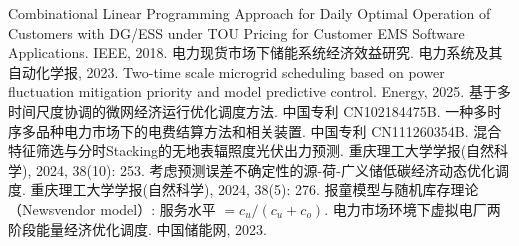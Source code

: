\documentclass[withoutpreface,bwprint]{cumcmthesis}
\begin{document}
\begin{abstract}
\textbf{针对问题四}\nobreak，本文在实时波动电价下重算问题二与三\nobreak，并明确 0:00 并不知道当日实际电价\nobreak：用周周期加权结构 $w_1p_{d-7,t}+w_2p_{d-14,t}+w_3p_{d-21,t}$ 叠加 LightGBM 残差修正预测电价\nobreak，平均绝对误差 \textbf{0.0451} 元/kWh\nobreak，预测只用于制定和调整计划\nobreak，费用一律按附件 4 实际电价结算\nobreak。第二问全年 \textbf{14\,386\,351} 元\nobreak，只比 0:00 已知实际电价的不可达上界高 \textbf{4.71 万元}\nobreak，差距 \textbf{0.33\%}\nobreak；第三问用当日已实现电价滚动修正并逐段调整\nobreak，全年 \textbf{14\,101\,772} 元\nobreak，比不做调整节约 \textbf{119.1 万元}\nobreak，降幅 \textbf{7.79\%}\nobreak。

\textbf{本文创新性在于}\nobreak：一是把预测与执行分开处理\nobreak，用报童分位统一刻画安全裕度\nobreak，证明裕度形式不重要\nobreak、分位水平才重要\nobreak；二是用预言机分解量化预测信息价值\nobreak，把距下界 136.9 万元缺口分解为光伏噪声 35.9\%\nobreak、负荷噪声 31.0\% 和交互 33.2\%\nobreak；三是揭示经验情景随机规划因情景内储能自由度重复利用而失效的机理\nobreak，费用上升 192.6\%\nobreak。

\end{abstract}














\begin{thebibliography}{9}
 Combinational Linear Programming Approach for Daily Optimal Operation of Customers with
DG/ESS under TOU Pricing for Customer EMS Software Applications. IEEE, 2018.
 电力现货市场下储能系统经济效益研究. 电力系统及其自动化学报, 2023.
 Two-time scale microgrid scheduling based on power fluctuation mitigation priority and
model predictive control. Energy, 2025.
 基于多时间尺度协调的微网经济运行优化调度方法. 中国专利 CN102184475B.
 一种多时序多品种电力市场下的电费结算方法和相关装置. 中国专利 CN111260354B.
 混合特征筛选与分时Stacking的无地表辐照度光伏出力预测. 重庆理工大学学报(自然科学), 2024, 38(10): 253.
 考虑预测误差不确定性的源-荷-广义储低碳经济动态优化调度. 重庆理工大学学报(自然科学), 2024, 38(5): 276.
 报童模型与随机库存理论（Newsvendor model\nobreak）: 服务水平 $=c_u/(c_u+c_o)$.
 电力市场环境下虚拟电厂两阶段能量经济优化调度. 中国储能网, 2023.
\end{thebibliography}

\newpage
\begin{appendices}

\end{appendices}
\end{document}
